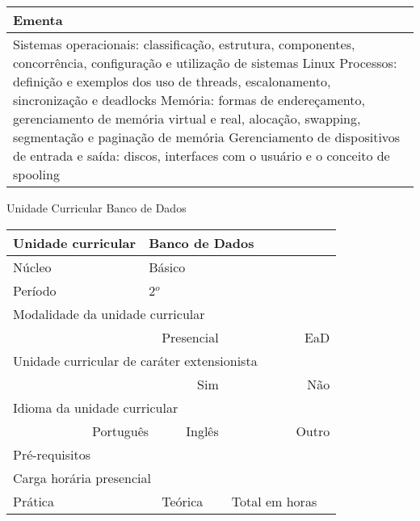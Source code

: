 \begin{quadro}[ht!]
\begin{tabular}{|p{3cm} p{2cm} p{3cm} p{2cm} p{3cm} p{2cm}|}
\multicolumn{6}{|p{15cm}|}{\cellcolor{blue1} Ementa} \\\hline
\hline\multicolumn{6}{|p{15cm}|}{\scriptsize Sistemas operacionais: classificação, estrutura, componentes, concorrência, configuração e utilização de sistemas Linux Processos: definição e exemplos dos uso de threads, escalonamento, sincronização e deadlocks Memória: formas de endereçamento, gerenciamento de memória virtual e real, alocação, swapping, segmentação e paginação de memória Gerenciamento de dispositivos de entrada e saída: discos, interfaces com o usuário e o conceito de spooling}\\\hline 
\hline
	\end{tabular}
\end{quadro}


\begin{quadro}[ht!]
  \centering\scriptsize
\caption{Unidade Curricular Banco de Dados}
\begin{tabular}{|p{3cm} p{2cm} p{3cm} p{2cm} p{3cm} p{2cm}|}\hline
\multicolumn{1}{|p{3cm}|}{\cellcolor{blue1} Unidade curricular} & \multicolumn{5}{p{9cm}|}{Banco de Dados}\\\hline
\multicolumn{1}{|p{3cm}|}{\cellcolor{blue1} Núcleo} & \multicolumn{5}{p{11.5cm}|}{Básico}\\\hline
\multicolumn{1}{|p{3cm}|}{\cellcolor{blue1} Período} & \multicolumn{5}{p{9cm}|}{2$^o$}\\\hline
\multicolumn{6}{|p{15cm}|}{\cellcolor{blue1} Modalidade da unidade curricular} \\\hline
\multicolumn{2}{|r}{		} &  \multicolumn{2}{r}{Presencial \XBox} & \multicolumn{2}{r|}{EaD \Square	} \\\hline
\multicolumn{6}{|p{15cm}|}{\cellcolor{blue1} Unidade curricular de caráter extensionista} \\\hline
\multicolumn{4}{|r}{			Sim \XBox	} & \multicolumn{2}{r|}{	Não \Square	}\\\hline
\multicolumn{6}{|p{15cm}|}{\cellcolor{blue1} Idioma da unidade curricular} \\ \hline
\multicolumn{2}{|r}{	Português \XBox	} &  \multicolumn{2}{r}{	Inglês \Square	} & \multicolumn{2}{r|}{	Outro \Square	} \\ \hline
\multicolumn{1}{|p{3cm}|}{\cellcolor{blue1} Pré-requisitos} & \multicolumn{5}{p{9cm}|}{}\\ \hline
\multicolumn{6}{|p{15cm}|}{\cellcolor{blue1} Carga horária presencial} \\ \hline
\multicolumn{1}{|p{3cm}|}{\raggedleft Prática} & \multicolumn{1}{p{1cm}|}{\centering	45	} &  \multicolumn{1}{p{3cm}|}{\raggedleft Teórica}  & \multicolumn{1}{p{1cm}|}{\centering 	45	} & \multicolumn{1}{p{3cm}|}{\raggedleft Total em horas} & \multicolumn{1}{p{1cm}|}{\raggedleft	90	} \\ \hline 

\end{tabular}
\end{quadro}
